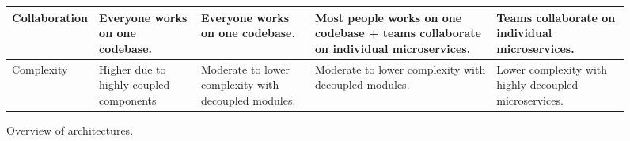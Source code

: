 \begin{sidewaysfigure}
\begin{tabular}{ |p{2.7cm}|p{3cm}|p{3cm}|p{4cm}|p{3cm}| }
        \hline
        Collaboration         & Everyone works on one codebase.                & Everyone works on one codebase.                      & Most people works on one codebase + teams collaborate on individual microservices.          & Teams collaborate on individual microservices.        \\
        \hline
        Complexity            & Higher due to highly coupled  components       & Moderate to lower complexity with decoupled modules. & Moderate to lower complexity with decoupled modules.                                        & Lower complexity with highly decoupled microservices. \\
        \hline
    \end{tabular}
    \caption{Overview of architectures.\label{table:architecture_compare}}
\end{sidewaysfigure}